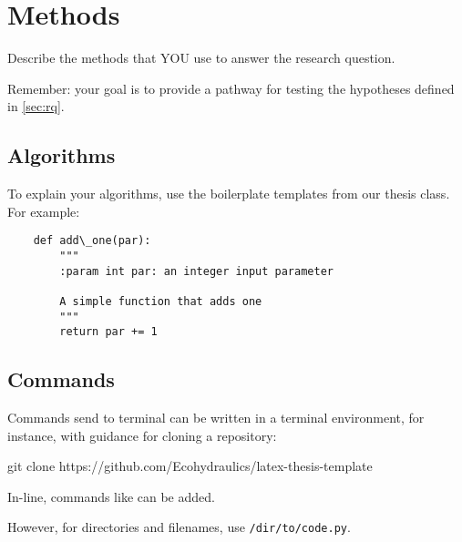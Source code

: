\chapter{Methods}
\label{ch:methods}

Describe the methods that YOU use to answer the research question.


Remember: your goal is to provide a pathway for testing the hypotheses defined in \autoref{sec:rq}.

\section{Algorithms}

To explain your algorithms, use the boilerplate templates from our thesis class. For example:

\begin{lstlisting}
	def add\_one(par):
		"""
		:param int par: an integer input parameter
		
		A simple function that adds one
		"""
		return par += 1
\end{lstlisting}


\section{Commands}

Commands send to terminal can be written in a terminal environment, for instance, with guidance for cloning a repository:

\begin{terminal}
	 git clone https://github.com/Ecohydraulics/latex-thesis-template
\end{terminal}

In-line, commands like  can be added.

However, for directories and filenames, use \texttt{/dir/to/code.py}.
